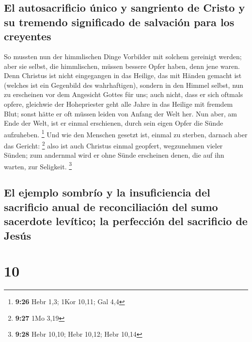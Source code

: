 \hypertarget{el-autosacrificio-uxfanico-y-sangriento-de-cristo-y-su-tremendo-significado-de-salvaciuxf3n-para-los-creyentes}{%
\subsection{El autosacrificio único y sangriento de Cristo y su tremendo
significado de salvación para los
creyentes}\label{el-autosacrificio-uxfanico-y-sangriento-de-cristo-y-su-tremendo-significado-de-salvaciuxf3n-para-los-creyentes}}

 So mussten nun der himmlischen Dinge Vorbilder mit
solchem gereinigt werden; aber sie selbst, die himmlischen, müssen
bessere Opfer haben, denn jene waren.  Denn Christus ist
nicht eingegangen in das Heilige, das mit Händen gemacht ist (welches
ist ein Gegenbild des wahrhaftigen), sondern in den Himmel selbst, nun
zu erscheinen vor dem Angesicht Gottes für uns;  auch
nicht, dass er sich oftmals opfere, gleichwie der Hohepriester geht alle
Jahre in das Heilige mit fremdem Blut;  sonst hätte er
oft müssen leiden von Anfang der Welt her. Nun aber, am Ende der Welt,
ist er einmal erschienen, durch sein eigen Opfer die Sünde aufzuheben.
\footnote{\textbf{9:26} Hebr 1,3; 1Kor 10,11; Gal 4,4} 
Und wie den Menschen gesetzt ist, einmal zu sterben, darnach aber das
Gericht: \footnote{\textbf{9:27} 1Mo 3,19}  also ist auch
Christus einmal geopfert, wegzunehmen vieler Sünden; zum andernmal wird
er ohne Sünde erscheinen denen, die auf ihn warten, zur Seligkeit.
\footnote{\textbf{9:28} Hebr 10,10; Hebr 10,12; Hebr 10,14}

\hypertarget{el-ejemplo-sombruxedo-y-la-insuficiencia-del-sacrificio-anual-de-reconciliaciuxf3n-del-sumo-sacerdote-levuxedtico-la-perfecciuxf3n-del-sacrificio-de-jesuxfas}{%
\subsection{El ejemplo sombrío y la insuficiencia del sacrificio anual
de reconciliación del sumo sacerdote levítico; la perfección del
sacrificio de
Jesús}\label{el-ejemplo-sombruxedo-y-la-insuficiencia-del-sacrificio-anual-de-reconciliaciuxf3n-del-sumo-sacerdote-levuxedtico-la-perfecciuxf3n-del-sacrificio-de-jesuxfas}}

\hypertarget{section-9}{%
\section{10}\label{section-9}}

